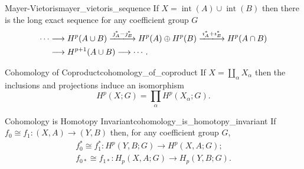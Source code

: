 \documentclass{article}
\begin{document}
\begin{theorem}{Mayer-Vietoris}{mayer_vietoris_sequence}
    If $X=\operatorname{int}(A) \cup \operatorname{int}(B)$ then there is the long exact sequence for any coefficient group $G$
    \begin{align*}
        \cdots &\longrightarrow H^p(A\cup B) \xlongrightarrow{\jmath^*_A - \jmath^*_B} H^p(A) \oplus H^p(B) \xlongrightarrow{\imath^*_A + \imath^*_B} H^p(A\cap B) \\
        &\longrightarrow H^{p+1}(A\cup B) \longrightarrow \cdots.
    \end{align*}
\end{theorem}

\begin{theorem}{Cohomology of Coproduct}{cohomology_of_coproduct}
    If $X=\coprod_\alpha X_\alpha$ then the inclusions and projections induce an isomorphism
    \[ H^p(X;G) = \prod_\alpha H^p(X_\alpha;G). \]
\end{theorem}

\begin{theorem}{Cohomology is Homotopy Invariant}{cohomology_is_homotopy_invariant}
    If $f_0\cong f_1:(X,A)\rightarrow (Y,B)$ then, for any coefficient group $G$,
    \begin{align*}
        f^*_0 \cong f^*_1: H^p(Y,B;G) \rightarrow H^p(X,A;G);\\
        f_{0*}\cong f_{1*}: H_p(X,A;G) \rightarrow H_p(Y,B;G).
    \end{align*}
\end{theorem}

% 
% 
\end{document}
